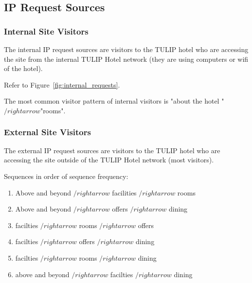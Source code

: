 \subsection{IP Request Sources}
\label{sec:results:ip_source}

\newcommand{\ra}[]{$/rightarrow$}


\subsubsection{Internal Site Visitors}

The internal IP request sources are visitors to the TULIP hotel who are accessing the site from the internal TULIP Hotel network (they are using computers or wifi of the hotel).

\label{sec:results:ip_source:internal}

Refer to Figure~\ref{fig:internal_requests}.

The most common visitor pattern of internal visitors is "about the hotel " \ra "rooms".


\subsubsection{External Site Visitors}

The external IP request sources are visitors to the TULIP hotel who are accessing the site outside of the TULIP Hotel network (most visitors).

\label{sec:results:ip_source:external}

Sequences in order of sequence frequency:
\begin{enumerate}
  \item Above and beyond $/rightarrow$ facilities $/rightarrow$ rooms
  \item Above and beyond $/rightarrow$ offers $/rightarrow$ dining
  \item facilties $/rightarrow$ rooms $/rightarrow$ offers
  \item facilties $/rightarrow$ offers $/rightarrow$ dining
  \item facilties $/rightarrow$ rooms $/rightarrow$ dining 
  \item above and beyond $/rightarrow$ facilties $/rightarrow$ dining
\end{enumerate}

